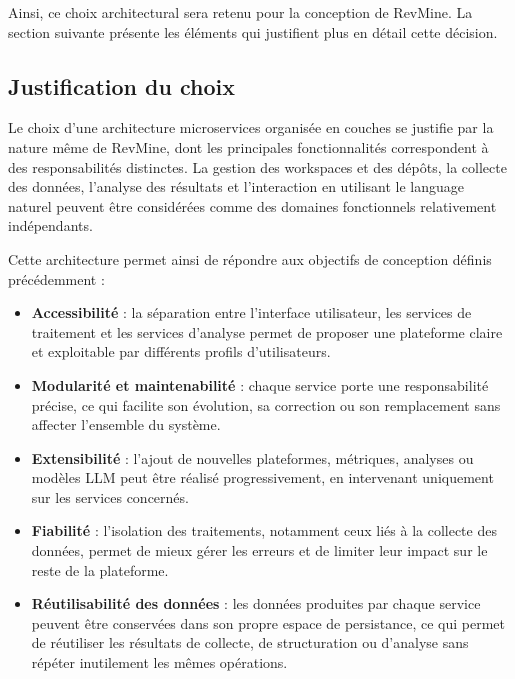 Ainsi, ce choix architectural sera retenu pour la conception de RevMine. La section suivante présente les éléments qui justifient plus en détail cette décision.



\subsection{Justification du choix}

Le choix d’une architecture microservices organisée en couches se justifie par la nature même de RevMine, dont les principales fonctionnalités correspondent à des responsabilités distinctes. La gestion des workspaces et des dépôts, la collecte des données, l’analyse des résultats et l’interaction en utilisant le language naturel peuvent être considérées comme des domaines fonctionnels relativement indépendants.

Cette architecture permet ainsi de répondre aux objectifs de conception définis précédemment :

\begin{itemize}
    \item \textbf{Accessibilité} : la séparation entre l’interface utilisateur, les services de traitement et les services d’analyse permet de proposer une plateforme claire et exploitable par différents profils d’utilisateurs.

    \item \textbf{Modularité et maintenabilité} : chaque service porte une responsabilité précise, ce qui facilite son évolution, sa correction ou son remplacement sans affecter l’ensemble du système.

    \item \textbf{Extensibilité} : l’ajout de nouvelles plateformes, métriques, analyses ou modèles LLM peut être réalisé progressivement, en intervenant uniquement sur les services concernés.

    \item \textbf{Fiabilité} : l’isolation des traitements, notamment ceux liés à la collecte des données, permet de mieux gérer les erreurs et de limiter leur impact sur le reste de la plateforme.

    \item \textbf{Réutilisabilité des données} : les données produites par chaque service peuvent être conservées dans son propre espace de persistance, ce qui permet de réutiliser les résultats de collecte, de structuration ou d’analyse sans répéter inutilement les mêmes opérations.
\end{itemize}

